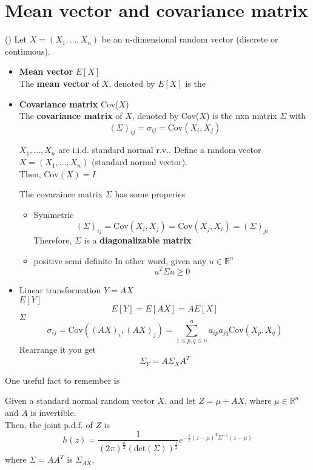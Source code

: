\section*{Mean vector and covariance matrix}
(\cite*{Und_Chatterjee})
Let \(X = (X_1, \dots, X_n)\) be an n-dimensional random vector (discrete or continuous). 
\begin{itemize}
    \item \textbf{Mean vector} \(E[X]\)\\
    The \textbf{mean vector} of  \(X\), denoted by \(E[X]\) is the  
    \item \textbf{Covariance matrix} Cov(\(X\))\\
    The \textbf{covariance matrix} of \(X\), denoted by Cov(\(X\)) is the nxn matrix \(\Sigma\) with 
    \[
        (\Sigma )_{ij} = \sigma_{ij} = \text{Cov} (X_i,X_j)
    \]   
    \begin{eg}
        \(X_1, \dots, X_n\) are i.i.d. standard normal r.v.. Define a random vector \(X = (X_1, \dots,X_n)\) (standard normal vector). \\
        Then, \(\text{Cov} (X) = I\)  
    \end{eg}
    \begin{remark}
        The covaraince matrix \(\Sigma \) has some properies  
        \begin{itemize}
            \item Symmetric
            \[
                (\Sigma )_{ij} = \text{Cov}(X_{i} ,X_{j} ) = \text{Cov} (X_{j} ,X_{i}) = (\Sigma)_{ji} 
            \]
            Therefore, \(\Sigma \) is a \textbf{diagonalizable matrix} 
            \item positive semi definite
                In other word, given any \(u \in \mathbb{R}^n\) 
                \[
                    u^T \Sigma u \geq 0
                \]
    

        \end{itemize}
    \end{remark}
    \item Linear transformation \(Y = AX\)\\ 
    \(E[Y]\) 
    \[
        E[Y]  = E[AX] = AE[X]
    \]
    \(\Sigma \) 
    \[
        \sigma_{ij} =  \text{Cov} ((AX)_i, (AX)_{j} ) = \sum_{1\leq p,q \leq n}^{n} a_{ip}a_{jq} \text{Cov}(X_{p} ,X_{q} ) 
    \]
    Rearrange it you get 
    \[
        \Sigma_Y = A \Sigma_X A^T
    \] 
\end{itemize}
One useful fact to remember is 
\begin{theorem}
    Given a standard normal random vector \(X\), and let \(Z = \mu  + AX\), where \(\mu \in \mathbb{R}^n\) and \(A\) is invertible. 
    \\Then, the joint p.d.f. of \(Z\) is 
    \[
        h(z) = \frac{1}{(2\pi)^{\frac{n}{2}} (\text{det}(\Sigma) )^{\frac{1}{2}}} e^{-\frac{1}{2} (z-\mu )^T \Sigma ^{-1} (z-\mu ) }
    \]     
    where \(\Sigma  = A A^T\) is \(\Sigma_{AX} \). 
\end{theorem}
